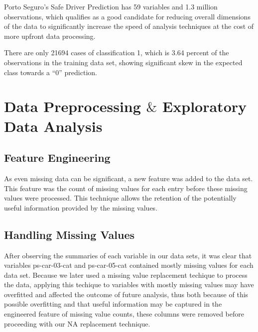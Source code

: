 \documentclass[fleqn,10pt]{SelfArx} %
\begin{document}
Porto Seguro’s Safe Driver Prediction has 59 variables and 1.3 million observations, which qualifies as a good candidate for reducing overall dimensions of the data to significantly increase the speed of analysis techniques at the cost of more upfront data processing.


There are only 21694 cases of classification 1, which is 3.64 percent of the observations in the training data set, showing significant skew in the expected class towards a ``0'' prediction.


\bigskip
\bigskip


\section{Data Preprocessing $\&$ Exploratory Data Analysis} %

\subsection{Feature Engineering}

As even missing data can be significant, a new feature was added to the data set. This feature was the count of missing values for each entry before these missing values were processed. This technique allows the retention of the potentially useful information provided by the missing values.
\subsection{Handling Missing Values}

After observing the summaries of each variable in our data sets, it was clear that variables ps-car-03-cat and ps-car-05-cat contained mostly missing values for each data set. Because we later used a missing value replacement techique to process the data, applying this techique to variables with mostly missing values may have overfitted and affected the outcome of future analysis, thus both because of this possible overfitting and that useful information may be captured in the engineered feature of missing value counts, these columns were removed before proceeding with our NA replacement technique.
\end{document}
